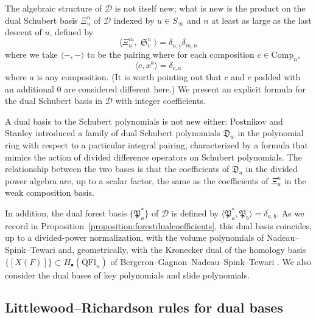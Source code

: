 \documentclass{amsart}
\theoremstyle{definition}
\theoremstyle{remark}
\numberwithin{equation}{subsection}
\DeclareMathOperator{\sch}{\mathfrak{S}}
\newcommand{\dsch}{\ensuremath{\Xi}}
\newcommand{\dcoma}{\mathcal{D}}
\newcommand{\forest}{\mathfrak{P}}
\begin{document}
The algebraic structure of $\dcoma$ is not itself new; what is new is the product on the dual Schubert basis $\dsch_u^n$ of $\dcoma$ indexed by $u\in S_\infty$ and $n$ at least as large as the last descent of $u$, defined by
$$\langle \dsch_u^m, \sch_v^n\rangle = \delta_{u,v}\delta_{m,n}$$
where we take $\langle -,-\rangle$ to be the pairing where for each composition $c\in\mathrm{Comp}_n$,
$$\langle c, x^a\rangle = \delta_{c,a}$$
where $a$ is any composition. (It is worth pointing out that $c$ and $c$ padded with an additional $0$ are considered different here.) We present an explicit formula for the dual Schubert basis in $\dcoma$ with integer coefficients.

A dual basis to the Schubert polynomials is not new either: Postnikov and Stanley \cite{postnikov2009chains} introduced a family of dual Schubert polynomials $\mathfrak{D}_w$ in the polynomial ring with respect to a particular integral pairing, characterized by a formula that mimics the action of divided difference operators on Schubert polynomials. The relationship between the two bases is that the coefficients of $\mathfrak{D}_u$ in the divided power algebra are, up to a scalar factor, the same as the coefficients of $\dsch_u^n$ in the weak composition basis. 

In addition, the dual forest basis $\{\forest_a^*\}$ of $\dcoma$ is defined by $\langle\forest_a^*,\forest_b\rangle=\delta_{a,b}$. As we record in Proposition~\ref{proposition:forestdualcoefficients}, this dual basis coincides, up to a divided-power normalization, with the volume polynomials of Nadeau--Spink--Tewari \cite{nadeau2024quasisymmetric} and, geometrically, with the Kronecker dual of the homology basis $\{[X(F)]\}\subset H_\bullet(\mathrm{QFl}_n)$ of Bergeron--Gagnon--Nadeau--Spink--Tewari \cite{bergeron2025qsymflag}. We also consider the dual bases of key polynomials and slide polynomials.

\subsection*{Littlewood--Richardson rules for dual bases}
\end{document}

